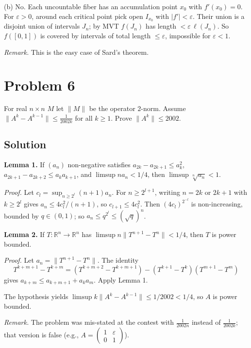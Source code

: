 \documentclass{article}
\begin{document}
(b) No. Each uncountable fiber has an accumulation point $x_0$ with $f'(x_0)=0$. For $\varepsilon>0$, around each critical point pick open $I_{x_0}$ with $|f'|<\varepsilon$. Their union is a disjoint union of intervals $J_n$; by MVT $f(J_n)$ has length $<\varepsilon\,\ell(J_n)$. So $f([0,1])$ is covered by intervals of total length $\le\varepsilon$, impossible for $\varepsilon<1$.

\textit{Remark.} This is the easy case of Sard's theorem.

\section*{Problem 6}
For real $n\times n$ $M$ let $\|M\|$ be the operator $2$-norm. Assume $\|A^k-A^{k-1}\|\le \frac{1}{2002k}$ for all $k\ge 1$. Prove $\|A^k\|\le 2002$.

\subsection*{Solution}
\textbf{Lemma 1.} If $(a_n)$ non-negative satisfies $a_{2k}-a_{2k+1}\le a_k^2$, $a_{2k+1}-a_{2k+2}\le a_k a_{k+1}$, and $\limsup n a_n<1/4$, then $\limsup\sqrt[n]{a_n}<1$.

\textit{Proof.} Let $c_l=\sup_{n\ge 2^l}(n+1)a_n$. For $n\ge 2^{l+1}$, writing $n=2k$ or $2k+1$ with $k\ge 2^l$ gives $a_n\le 4c_l^2/(n+1)$, so $c_{l+1}\le 4c_l^2$. Then $(4c_l)^{2^{-l}}$ is non-increasing, bounded by $q\in(0,1)$; so $a_n\le q^{2^l}\le(\sqrt q)^n$.

\textbf{Lemma 2.} If $T:\mathbb{R}^n\to\mathbb{R}^n$ has $\limsup n\|T^{n+1}-T^n\|<1/4$, then $T$ is power bounded.

\textit{Proof.} Let $a_n=\|T^{n+1}-T^n\|$. The identity
\[T^{k+m+1}-T^{k+m}=(T^{k+m+2}-T^{k+m+1})-(T^{k+1}-T^k)(T^{m+1}-T^m)\]
gives $a_{k+m}\le a_{k+m+1}+a_k a_m$. Apply Lemma 1.

The hypothesis yields $\limsup k\|A^k-A^{k-1}\|\le 1/2002 < 1/4$, so $A$ is power bounded.

\textit{Remark.} The problem was mis-stated at the contest with $\frac{1}{2002n}$ instead of $\frac{1}{2002k}$; that version is false (e.g., $A=\begin{pmatrix}1&\varepsilon\\0&1\end{pmatrix}$).
\end{document}
